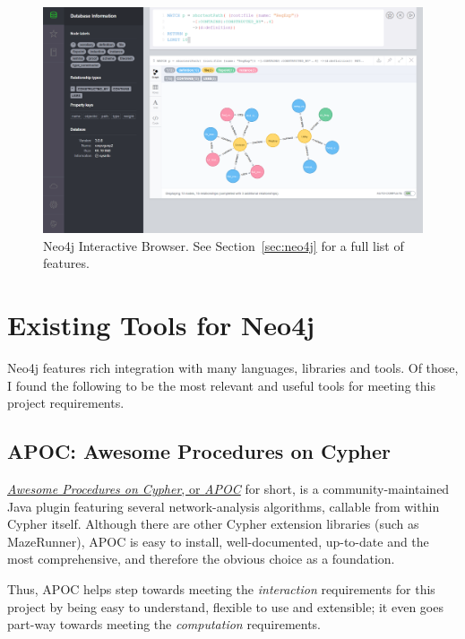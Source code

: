 \begin{figure}[tbp]

\includegraphics[width=\textwidth]{img/Neo4j_Browser.png}
\caption{Neo4j Interactive Browser. See Section~\ref{sec:neo4j} for a full
list of features.}\label{fig:neo4jbrowser}

\end{figure}

\section{Existing Tools for Neo4j}\label{subsec:existtoolsneo4j}

Neo4j features rich integration with many languages, libraries and tools.  Of
those, I found the following to be the most relevant and useful tools for
meeting this project requirements.

\subsection{APOC: Awesome Procedures on Cypher}

\href{http://github.com/neo4j-contrib/neo4j-apoc-procedures}{\emph{Awesome
Procedures on Cypher}, or \emph{APOC}} for short, is a community-maintained Java
plugin featuring several network-analysis algorithms, callable from within
Cypher itself.  Although there are other Cypher extension libraries (such as
MazeRunner), APOC is easy to install, well-documented, up-to-date and the most
comprehensive, and therefore the obvious choice as a foundation.

Thus, APOC helps step towards meeting the \emph{interaction} requirements for
this project by being easy to understand, flexible to use and extensible; it
even goes part-way towards meeting the \emph{computation} requirements.


